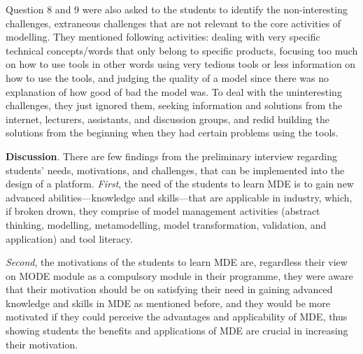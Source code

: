 \documentclass[12pt, a4paper]{report} \usepackage[titletoc]{appendix}
\begin{document}
\begin{appendices}
Question 8 and 9 were also asked to the students to identify the non-interesting challenges, extraneous challenges that are not relevant to the core activities of modelling. They mentioned following activities: dealing with very specific technical concepts/words that only belong to specific products, focusing too much on how to use tools in other words using very tedious tools or less information on how to use the tools, and judging the quality of a model since there was no explanation of how good of bad the model was. To deal with the uninteresting challenges, they just ignored them, seeking information and solutions from the internet, lecturers, assistants, and discussion groups, and redid building the solutions from the beginning when they had certain problems using the tools.

\textbf{Discussion}. There are few findings from the preliminary interview regarding students' needs, motivations, and challenges, that can be implemented into the design of a platform. \textit{First}, the need of the students to learn MDE is to gain new advanced abilities---knowledge and skills---that are applicable in industry, which, if broken drown, they comprise of model management activities (abstract thinking, modelling, metamodelling, model transformation, validation, and application) and tool literacy. 

\textit{Second}, the motivations of the students to learn MDE are, regardless their view on MODE module as a compulsory module in their programme, they were aware that their motivation should be on satisfying their need in gaining advanced knowledge and skills in MDE as mentioned before, and they would be more motivated if they could perceive the advantages and applicability of MDE, thus showing students the benefits and applications of MDE are crucial in increasing their motivation.


\end{appendices}
\end{document}

